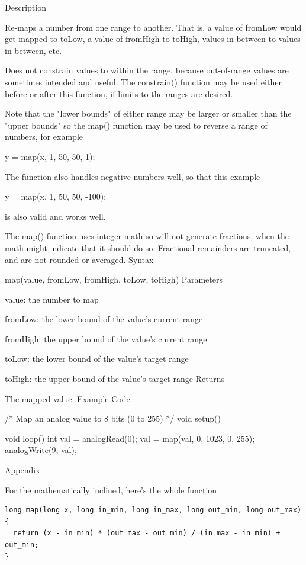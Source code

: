 \documentclass[12pt,a4paper]{report}  %
\begin{document}
Description

Re-maps a number from one range to another. That is, a value of fromLow would get mapped to toLow, a value of fromHigh to toHigh, values in-between to values in-between, etc.

Does not constrain values to within the range, because out-of-range values are sometimes intended and useful. The constrain() function may be used either before or after this function, if limits to the ranges are desired.

Note that the "lower bounds" of either range may be larger or smaller than the "upper bounds" so the map() function may be used to reverse a range of numbers, for example

y = map(x, 1, 50, 50, 1);

The function also handles negative numbers well, so that this example

y = map(x, 1, 50, 50, -100);

is also valid and works well.

The map() function uses integer math so will not generate fractions, when the math might indicate that it should do so. Fractional remainders are truncated, and are not rounded or averaged.
Syntax

map(value, fromLow, fromHigh, toLow, toHigh)
Parameters

value: the number to map

fromLow: the lower bound of the value’s current range

fromHigh: the upper bound of the value’s current range

toLow: the lower bound of the value’s target range

toHigh: the upper bound of the value’s target range
Returns

The mapped value.
Example Code

/* Map an analog value to 8 bits (0 to 255) */
void setup() {}

void loop()
{
  int val = analogRead(0);
  val = map(val, 0, 1023, 0, 255);
  analogWrite(9, val);
}

Appendix

For the mathematically inclined, here’s the whole function

\begin{lstlisting}[label=digitalwrite,caption='']
long map(long x, long in_min, long in_max, long out_min, long out_max)
{
  return (x - in_min) * (out_max - out_min) / (in_max - in_min) + out_min;
}
\end{lstlisting}
\end{document}
